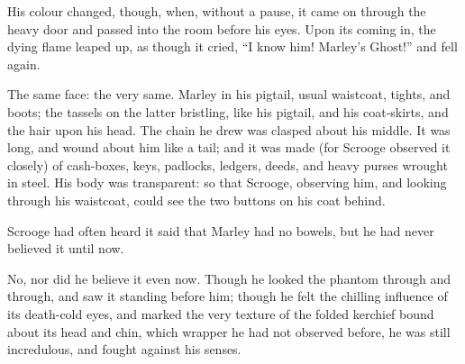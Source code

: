 \documentclass[paper=a5,BCOR=15mm,twoside,DIV=15,headinclude=off,12pt,chapterprefix=off,openany,headings=huge]{scrbook} %
\begin{document}
His colour changed, though, when, without a pause, it came on through the heavy door and passed into the room before his eyes. Upon its coming in, the dying flame leaped up, as though it cried, \enquote{I know him! Marley's Ghost!} and fell again.

The same face: the very same. Marley in his pigtail, usual waistcoat, tights, and boots; the tassels on the latter bristling, like his pigtail, and his coat-skirts, and the hair upon his head. The chain he drew was clasped about his middle. It was long, and wound about him like a tail; and it was made (for Scrooge observed it closely) of cash-boxes, keys, padlocks, ledgers, deeds, and heavy purses wrought in steel. His body was transparent: so that Scrooge, observing him, and looking through his waistcoat, could see the two buttons on his coat behind.

Scrooge had often heard it said that Marley had no bowels, but he had never believed it until now.

No, nor did he believe it even now. Though he looked the phantom through and through, and saw it standing before him; though he felt the chilling influence of its death-cold eyes, and marked the very texture of the folded kerchief bound about its head and chin, which wrapper he had not observed before, he was still incredulous, and fought against his senses.
\end{document}
